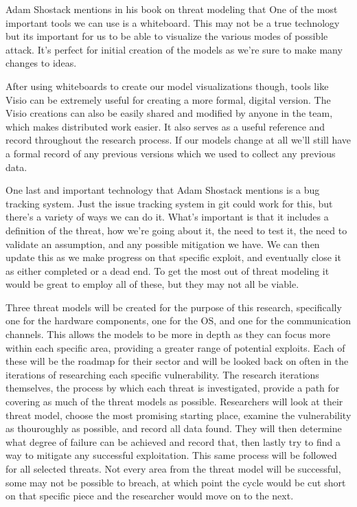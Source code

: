 \documentclass[IEEEtran,letterpaper,10pt,notitlepage,draftclsnofoot,onecolumn]{article}
\begin{document}
Adam Shostack mentions in his book on threat modeling that  \cite[p.203]{TMDS}
One of the most important tools we can use is a whiteboard.
This may not be a true technology but its important for us to be able to visualize the various modes of possible attack.
It's perfect for initial creation of the models as we're sure to make many changes to ideas.

After using whiteboards to create our model visualizations though, tools like Visio can be extremely useful for creating a more formal, digital version.
The Visio creations can also be easily shared and modified by anyone in the team, which makes distributed work easier.
It also serves as a useful reference and record throughout the research process.
If our models change at all we'll still have a formal record of any previous versions which we used to collect any previous data.

One last and important technology that Adam Shostack mentions is a bug tracking system.
Just the issue tracking system in git could work for this, but there's a variety of ways we can do it. 
What's important is that it includes a definition of the threat, how we're going about it, the need to test it, the need to validate an assumption, and any possible mitigation we have. \cite[p.205]{TMDS}
We can then update this as we make progress on that specific exploit, and eventually close it as either completed or a dead end.
To get the most out of threat modeling it would be great to employ all of these, but they may not all be viable.

Three threat models will be created for the purpose of this research, specifically one for the hardware components, one for the OS, and one for the communication channels.
This allows the models to be more in depth as they can focus more within each specific area, providing a greater range of potential exploits.
Each of these will be the roadmap for their sector and will be looked back on often in the iterations of researching each specific vulnerability.
The research iterations themselves, the process by which each threat is investigated, provide a path for covering as much of the threat models as possible.
Researchers will look at their threat model, choose the most promising starting place, examine the vulnerability as thouroughly as possible, and record all data found.
They will then determine what degree of failure can be achieved and record that, then lastly try to find a way to mitigate any successful exploitation.
This same process will be followed for all selected threats.
Not every area from the threat model will be successful, some may not be possible to breach, at which point the cycle would be cut short on that specific piece and the researcher would move on to the next.
\end{document}
